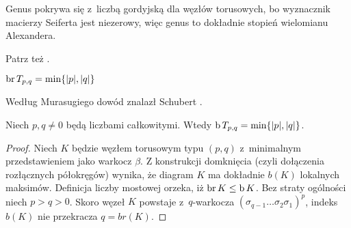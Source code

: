 Genus pokrywa się z~liczbą gordyjską dla węzłów torusowych, bo wyznacznik macierzy Seiferta jest niezerowy, więc genus to dokładnie stopień wielomianu Alexandera.

Patrz też \cite[s. 149]{murasugi96}.

\begin{proposition}
%
\label{prp:torus_bridge_number}%
    $\operatorname{br} T_{p, q} = \min \{|p|, |q|\}$
\end{proposition}

Według Murasugiego dowód znalazł Schubert \cite{schubert54}.
%

\begin{corollary}
%
\label{cor:torus_braid_number}%
    Niech $p, q \neq 0$ będą liczbami całkowitymi.
    Wtedy $\operatorname{b} T_{p, q} = \min \{|p|, |q|\}$.
\end{corollary}

\begin{proof}
    Niech $K$ będzie węzłem torusowym typu $(p,q)$ z~minimalnym przedstawieniem jako warkocz $\beta$.
    Z konstrukcji domknięcia (czyli dołączenia rozłącznych półokręgów) wynika,
    że diagram $K$ ma dokładnie $b(K)$ lokalnych maksimów.
    Definicja liczby mostowej orzeka, iż $\operatorname{br} K \le \operatorname{b} K$.
    Bez straty ogólności niech $p > q > 0$.
    Skoro węzeł $K$ powstaje z~$q$-warkocza $(\sigma_{q-1} \ldots \sigma_2\sigma_1)^p$,
    indeks $b(K)$ nie przekracza $q = br(K)$.
\end{proof}


